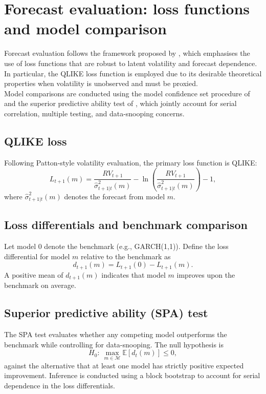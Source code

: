 \documentclass[12pt]{report}
\begin{document}
\section{Forecast evaluation: loss functions and model comparison}
Forecast evaluation follows the framework proposed by \cite{patton2011volatility}, which emphasises the use of loss functions that are robust to latent volatility and forecast dependence. In particular, the QLIKE loss function is employed due to its desirable theoretical properties when volatility is unobserved and must be proxied. 
\\Model comparisons are conducted using the model confidence set procedure of \cite{hansen2011model} and the superior predictive ability test of \cite{hansen2005test}, which jointly account for serial correlation, multiple testing, and data-snooping concerns.

\subsection{QLIKE loss}

Following Patton-style volatility evaluation, the primary loss function is QLIKE:
\begin{equation}
L_{t+1}(m) = \frac{RV_{t+1}}{\widehat{\sigma}^2_{t+1|t}(m)} 
- \ln\!\left(\frac{RV_{t+1}}{\widehat{\sigma}^2_{t+1|t}(m)}\right) - 1,
\end{equation}
where $\widehat{\sigma}^2_{t+1|t}(m)$ denotes the forecast from model $m$.

\subsection{Loss differentials and benchmark comparison}

Let model $0$ denote the benchmark (e.g., GARCH(1,1)). Define the loss differential for model $m$ relative to the benchmark as
\begin{equation}
d_{t+1}(m) = L_{t+1}(0) - L_{t+1}(m).
\end{equation}
A positive mean of $d_{t+1}(m)$ indicates that model $m$ improves upon the benchmark on average.

\subsection{Superior predictive ability (SPA) test}

The SPA test evaluates whether any competing model outperforms the benchmark while controlling for data-snooping. The null hypothesis is
\begin{equation}
H_0:\ \max_{m \in \mathcal{M}} \mathbb{E}\left[d_{t}(m)\right] \le 0,
\end{equation}
against the alternative that at least one model has strictly positive expected improvement. Inference is conducted using a block bootstrap to account for serial dependence in the loss differentials.
\end{document}
